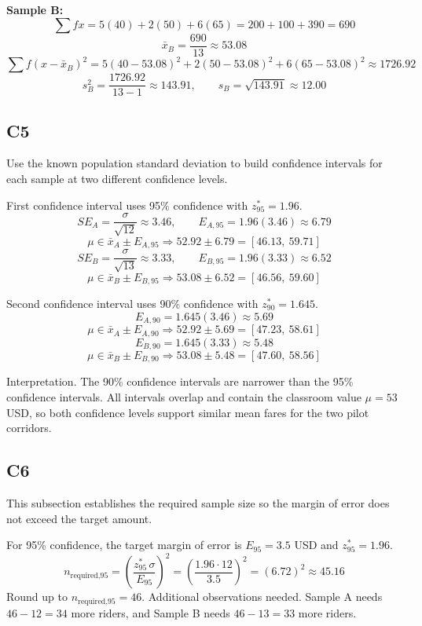 \begin{ExamProblems}
		\textbf{Sample B:}
		\[
		\sum f x = 5(40) + 2(50) + 6(65) = 200 + 100 + 390 = 690
		\]
		\[
		\bar{x}_B = \frac{690}{13} \approx 53.08
		\]
		\[
		\sum f(x-\bar{x}_B)^2 = 5(40-53.08)^2 + 2(50-53.08)^2 + 6(65-53.08)^2 \approx 1726.92
		\]
		\[
		s_B^2 = \frac{1726.92}{13-1} \approx 143.91, \qquad s_B = \sqrt{143.91} \approx 12.00
		\]
		
		\subsection*{C5}
		Use the known population standard deviation to build confidence intervals for each sample at two different confidence levels.
		
		First confidence interval uses 95\% confidence with $z^*_{95} = 1.96$.
		\[
		SE_A = \frac{\sigma}{\sqrt{12}} \approx 3.46, \qquad E_{A,95} = 1.96(3.46) \approx 6.79
		\]
		\[
		\mu \in \bar{x}_A \pm E_{A,95} \Rightarrow 52.92 \pm 6.79 = [46.13,\ 59.71]
		\]
		\[
		SE_B = \frac{\sigma}{\sqrt{13}} \approx 3.33, \qquad E_{B,95} = 1.96(3.33) \approx 6.52
		\]
		\[
		\mu \in \bar{x}_B \pm E_{B,95} \Rightarrow 53.08 \pm 6.52 = [46.56,\ 59.60]
		\]
		
		Second confidence interval uses 90\% confidence with $z^*_{90} = 1.645$.
		\[
		E_{A,90} = 1.645(3.46) \approx 5.69
		\]
		\[
		\mu \in \bar{x}_A \pm E_{A,90} \Rightarrow 52.92 \pm 5.69 = [47.23,\ 58.61]
		\]
		\[
		E_{B,90} = 1.645(3.33) \approx 5.48
		\]
		\[
		\mu \in \bar{x}_B \pm E_{B,90} \Rightarrow 53.08 \pm 5.48 = [47.60,\ 58.56]
		\]
		
		Interpretation.
		The 90\% confidence intervals are narrower than the 95\% confidence intervals.
		All intervals overlap and contain the classroom value $\mu = 53$ USD, so both confidence levels support similar mean fares for the two pilot corridors.
		
		\subsection*{C6}
		This subsection establishes the required sample size so the margin of error does not exceed the target amount.
		
		For 95\% confidence, the target margin of error is $E_{95} = 3.5$ USD and $z^*_{95} = 1.96$.
		\[
		n_{\text{required,95}} = \left(\frac{z^*_{95}\,\sigma}{E_{95}}\right)^2
		= \left(\frac{1.96 \cdot 12}{3.5}\right)^2
		= \left(6.72\right)^2
		\approx 45.16
		\]
		Round up to $n_{\text{required,95}} = 46$.
		Additional observations needed.
		Sample A needs $46 - 12 = 34$ more riders, and Sample B needs $46 - 13 = 33$ more riders.
		

\end{ExamProblems}
